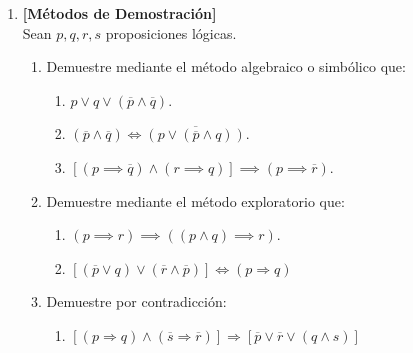 \documentclass[letterpaper,11pt]{article}
\newcommand{\ssi}{\Longleftrightarrow} %
\theoremstyle{plain}
\begin{document}
\begin{enumerate}[\bf P1.]
    \item \textbf{[Métodos de Demostración]} \\
		Sean $p,q,r,s$ proposiciones lógicas.
		\begin{enumerate}
			\item Demuestre mediante el método algebraico o simbólico que:
			\begin{enumerate}
				\item $p \lor q \lor (\overline{p} \land \overline {q} )   $.
				\item $(\overline{p} \land \overline{q}) \iff \overline{(p \lor (\overline{p}  \land q ))}$.
				\item $[(p \implies \overline{q}) \land (r \implies q)] \implies (p \implies \overline{r})$.
			\end{enumerate}
			\item Demuestre mediante el método exploratorio que:
			\begin{enumerate}
				\item $
				(p \implies r) \implies ((p\wedge q)\implies r)
				$.
				\item $[(\overline{p} \lor q) \lor (\overline{r} \land \overline{p})]\Longleftrightarrow (p\Rightarrow q)$
			\end{enumerate}
			\item Demuestre por contradicción:
			\begin{enumerate}
				\item $[(p \Rightarrow q) \land (\overline{s} \Rightarrow \overline{r})] \Longrightarrow [\overline{p} \lor \overline{r} \lor (q \land s)]$
			\end{enumerate}
		\end{enumerate}
		
	

\end{enumerate}
\end{document}
